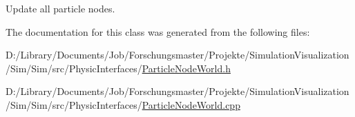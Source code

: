 Update all particle nodes. 



The documentation for this class was generated from the following files\+:\begin{DoxyCompactItemize}
\item 
D\+:/\+Library/\+Documents/\+Job/\+Forschungsmaster/\+Projekte/\+Simulation\+Visualization/\+Sim/\+Sim/src/\+Physic\+Interfaces/\mbox{\hyperlink{_particle_node_world_8h}{Particle\+Node\+World.\+h}}\item 
D\+:/\+Library/\+Documents/\+Job/\+Forschungsmaster/\+Projekte/\+Simulation\+Visualization/\+Sim/\+Sim/src/\+Physic\+Interfaces/\mbox{\hyperlink{_particle_node_world_8cpp}{Particle\+Node\+World.\+cpp}}\end{DoxyCompactItemize}

